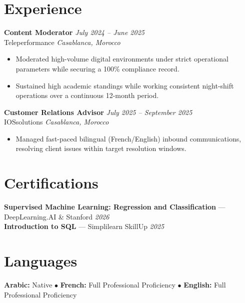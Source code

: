 \documentclass[11pt,a4paper]{article}
\begin{document}
\section{Experience}

\textbf{Content Moderator} \hfill \textit{July 2024 -- June 2025}\\
Teleperformance \hfill \textit{Casablanca, Morocco}
\begin{itemize}
    \item Moderated high-volume digital environments under strict operational parameters while securing a 100\% compliance record.
    \item Sustained high academic standings while working consistent night-shift operations over a continuous 12-month period.
\end{itemize}

\vspace{4pt}

\textbf{Customer Relations Advisor} \hfill \textit{July 2025 -- September 2025}\\
IOSsolutions \hfill \textit{Casablanca, Morocco}
\begin{itemize}
    \item Managed fast-paced bilingual (French/English) inbound communications, resolving client issues within target resolution windows.
\end{itemize}

\section{Certifications}
\textbf{Supervised Machine Learning: Regression and Classification} --- DeepLearning.AI \& Stanford \hfill \textit{2026}\\
\textbf{Introduction to SQL} --- Simplilearn SkillUp \hfill \textit{2025}

\section{Languages}
\centerline{
    \textbf{Arabic:} Native \quad $\bullet$ \quad
    \textbf{French:} Full Professional Proficiency \quad $\bullet$ \quad
    \textbf{English:} Full Professional Proficiency
}
\end{document}
